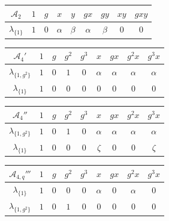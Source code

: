 \documentclass[reqno]{amsart}
\theoremstyle{definition}
\numberwithin{equation}{section}\theoremstyle{plain}
\theoremstyle{definition}
\begin{document}
	\begin{center}
		\begin{table}[!ht]
        \begin{tabular}{| c | c | c | c | c | c | c | c | c | }\hline
$\mathcal{A}_2$ & $1$ & $g$ & $x$ & $y$ & $gx$ & $gy$ & $xy$ & $gxy$	\\ \hline
$\lambda_{\{1\}}$ &  $1$ & $0$ & $\alpha$ & $\beta$ & $\alpha$ & $\beta$ & $0$ & $0$ \\ \hline
\end{tabular}
	
           \vspace{0.2cm}
           
\begin{tabular}{| c | c | c | c | c | c | c | c | c | }\hline
$\mathcal{A}_{4}'$	& $1$ & $g$ & $g^2$ & $g^3$ & $x$ & $gx$ & $g^2x$ & $g^3x$	\\ \hline
$\lambda_{\{1, g^2\}}$ &  $1$ & $0$ & $1$ & $0$ & $\alpha$ & $\alpha$ & $\alpha$ & $\alpha$  \\ \hline
$\lambda_{\{1\}}$ &  $1$ & $0$ & $0$ & $0$ & $0$ & $0$ & $0$ & $0$ \\ \hline
\end{tabular}

\vspace{0.2cm}
 
\begin{tabular}{| c | c | c | c | c | c | c | c | c | }\hline
$\mathcal{A}_{4}''$ & $1$ & $g$ & $g^2$ & $g^3$ & $x$ & $gx$ & $g^2x$ & $g^3x$	\\ \hline
$\lambda_{\{1,g^2\}}$ &  $1$ & $0$ & $1$ & $0$ & $\alpha$ & $\alpha$ & $\alpha$ & $\alpha$ \\ \hline
$\lambda_{\{1\}}$ &  $1$ & $0$ & $0$ & $0$ & $\zeta$ & $0$ & $0$ & $\zeta$ \\ \hline
\end{tabular}

  \vspace{0.2cm}              

\begin{tabular}{| c | c | c | c | c | c | c | c | c | }\hline$\mathcal{A}_{4,q}'''$  & $1$ & $g$ & $g^2$ & $g^3$ & $x$ & $gx$ & $g^2x$ & $g^3x$	\\ \hline
$\lambda_{\{1\}}$ &  $1$ & $0$ & $0$ & $0$ & $\alpha$ & $0$ & $\alpha$ & $0$  \\ \hline
$\lambda_{\{1, g^2\}}$ &  $1$ & $0$ & $1$ & $0$ & $0$ & $0$ & $0$ & $0$ \\ \hline 
\end{tabular}


\end{table}
\end{center}
\end{document}
